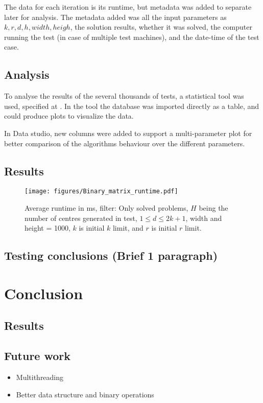 \documentclass[a4paper]{article}
\begin{document}
The data for each iteration is its runtime, but metadata was added to separate later for analysis. The
metadata added was all the input parameters as $k,r,d,h, width, heigh$, the solution results, whether it was solved, the
computer running the test (in case of multiple test machines), and the date-time of the test case.

\subsection{Analysis}
To analyse the results of the several thousands of tests, a statistical tool was used, specified at
. In the tool the database was imported directly as a table, and could produce
plots to visualize the data. 

In Data studio, new columns were added to support a multi-parameter plot for better comparison of the
algorithms behaviour over the different parameters.

\subsection{Results}
\begin{figure}[H]
    \centering
    \texttt{[image: figures/Binary\_matrix\_runtime.pdf]}
    \caption{Average runtime in ms, filter: Only solved problems, $H$ being the number of centres generated in test, $1 \leq d \leq 2k+1$, width and height = 1000, $k$ is initial $k$ limit, and $r$ is initial $r$ limit.}
    \label{fig:result-table}
\end{figure}

\subsection{Testing conclusions (Brief 1 paragraph)}

%
%
\newpage

\section{Conclusion}
\subsection{Results}
\subsection{Future work}
\begin{itemize}
    \item Multithreading
    \item Better data structure and binary operations
\end{itemize}





%
%
\newpage

\end{document}
